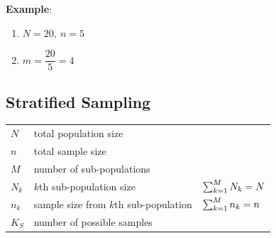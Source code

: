 \vspace{0.5cm}
\textbf{Example}:
\begin{enumerate}[itemsep=0.3cm]
    \item[] $N = 20,\ n = 5$

    \item[] $m = \dfrac{20}{5}=4$

    
\end{enumerate}






\subsection{Stratified Sampling \cite{statistics/book/Statistics-for-Data-Scientists/Maurits-Kaptein}}\label{Sampling Plans/Representative Sampling/Stratified Sampling}

\begin{customArrayStretch}{1.3}
\begin{table}[H]
    \centering
    \begin{tabular}{l l l}
        $N$ & total population size & \\
        $n$ & total sample size & \\
        $M$ & number of sub-populations & \\
        $N_k$ & $k$th sub-population size & $\textstyle\sum_{k=1}^{M} N_k = N$ \\
        $n_k$ & sample size from $k$th sub-population & $\textstyle\sum_{k=1}^{M} n_k = n$ \\
        $K_S$ & number of possible samples \\
    \end{tabular}
\end{table}
\end{customArrayStretch}

